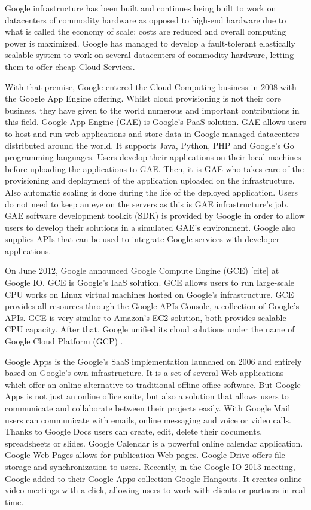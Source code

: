 Google infrastructure has been built and continues being built to work on datacenters of commodity hardware as opposed to high-end hardware due to what is called the economy of scale: costs are reduced and overall computing power is maximized. Google has managed to develop a fault-tolerant elastically scalable system to work on several datacenters of commodity hardware, letting them to offer cheap Cloud Services.
\par
With that premise, Google entered the Cloud Computing business in 2008 with the Google App Engine offering. Whilst cloud provisioning is not their core business, they have given to the world numerous and important contributions in this field.
Google App Engine (GAE) is Google's PaaS solution. GAE allows users to host and run web applications and store data in Google-managed datacenters distributed around the world. It supports Java, Python, PHP and Google's Go programming languages. Users develop their applications on their local machines before uploading the applications to GAE. Then, it is GAE who takes care of the provisioning and deployment of the application uploaded on the infrastructure. Also automatic scaling is done during the life of the deployed application. Users do not need to keep an eye on the servers as this is GAE infrastructure's job. GAE software development toolkit (SDK) is provided by Google in order to allow users to develop their solutions in a simulated GAE's environment. Google also supplies APIs that can be used to integrate Google services with developer applications.
\par
On June 2012, Google announced Google Compute Engine (GCE) [cite] at Google IO. GCE is Google's IaaS solution. GCE allows users to run large-scale CPU works on Linux virtual machines hosted on Google's infrastructure. GCE provides all resources through the Google APIs Console, a collection of Google's APIs. GCE is very similar to Amazon's EC2 solution, both provides scalable CPU capacity. 
After that, Google unified its cloud solutions under the name of Google Cloud Platform (GCP) \cite{CloudGoogle}. 
\par
Google Apps \cite{GoogleApps} is the Google's SaaS implementation launched on 2006 and entirely based on Google's own infrastructure. It is a set of several Web applications which offer an online alternative to traditional offline office software. But Google Apps is not just an online office suite, but also a solution that allows users to communicate and collaborate between their projects easily. With Google Mail users can communicate with emails, online messaging and voice or video calls. Thanks to Google Docs users can create, edit, delete their documents, spreadsheets or slides. Google Calendar is a powerful online calendar application. Google Web Pages allows for publication Web pages. Google Drive offers file storage and synchronization to users. Recently, in the Google IO 2013 meeting, Google added to their Google Apps collection Google Hangouts. It creates online video meetings with a click, allowing users to work with clients or partners in real time.
